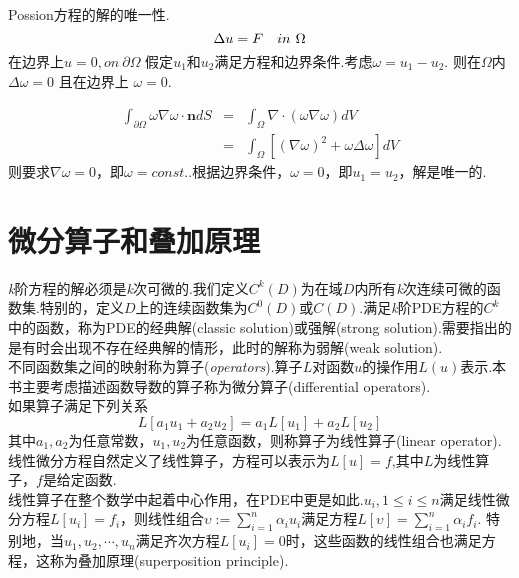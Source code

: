 	\begin{myexample}
		Possion方程的解的唯一性.
		\begin{equation*}
			\Delta u = F \quad in \hspace{0.05in} \Omega 
		\end{equation*}
		在边界上$u = 0, on \ \partial \Omega $
		假定$u_1$和$u_2$满足方程和边界条件.考虑$\omega = u_1 - u_2$. 则在$\Omega$内$\Delta \omega = 0$ 且在边界上 $\omega = 0$.
		
		\begin{eqnarray*}
			\int_{\partial \Omega} \omega \nabla \omega \cdot \mathbf{n} dS & = & \int_{\Omega} \nabla \cdot (\omega \nabla \omega) dV \\
			& = & \int_{\Omega} [(\nabla \omega)^2 + \omega \Delta \omega] dV
		\end{eqnarray*}
	则要求$\nabla \omega=0$，即$\omega = const.$.根据边界条件，$\omega = 0$，即$u_1=u_2$，解是唯一的.
	\end{myexample}
	
\section{微分算子和叠加原理}
\textit{k}阶方程的解必须是\textit{k}次可微的.我们定义$C^k(D)$为在域$D$内所有\textit{k}次连续可微的函数集.特别的，定义$D$上的连续函数集为$C^0(D)$或$C(D)$.满足\textit{k}阶PDE方程的$C^k$中的函数，称为PDE的经典解(classic solution)或强解(strong solution).需要指出的是有时会出现不存在经典解的情形，此时的解称为弱解(weak solution).\\
不同函数集之间的映射称为算子(\textit{operators}).算子$L$对函数$u$的操作用$L(u)$表示.本书主要考虑描述函数导数的算子称为微分算子(differential operators).\\
如果算子满足下列关系
\begin{equation}
	L[a_1u_1+a_2u_2]=a_1L[u_1] + a_2L[u_2]
\end{equation}
其中$a_1,a_2$为任意常数，$u_1,u_2$为任意函数，则称算子为线性算子(linear operator).线性微分方程自然定义了线性算子，方程可以表示为$L[u]=f$,其中$L$为线性算子，$f$是给定函数.\\
线性算子在整个数学中起着中心作用，在PDE中更是如此.$u_i, 1\le i \le n $满足线性微分方程$L[u_i]=f_i$，则线性组合$\upsilon:=\sum_{i=1}^n \alpha_i u_i$满足方程$L[\upsilon]=\sum_{i=1}^{n} \alpha_i f_i$. 特别地，当$u_1,u_2,\cdots, u_n$满足齐次方程$L[u_i]=0$时，这些函数的线性组合也满足方程，这称为叠加原理(superposition principle).

